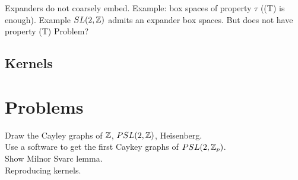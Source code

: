 Expanders do not coarsely embed. Example: box spaces of property $\tau$ ((T) is enough). Example $SL(2,\mathbb Z)$ admits an expander box spaces. But does not have property (T) Problem?\\



\subsection{Kernels}

\section{Problems}

Draw the Cayley graphs of $\mathbb Z$, $PSL(2,\mathbb Z)$, Heisenberg.\\

Use a software to get the first Caykey graphs of $PSL(2,\mathbb Z_p)$.\\

Show Milnor Svarc lemma.\\

Reproducing kernels.\\
